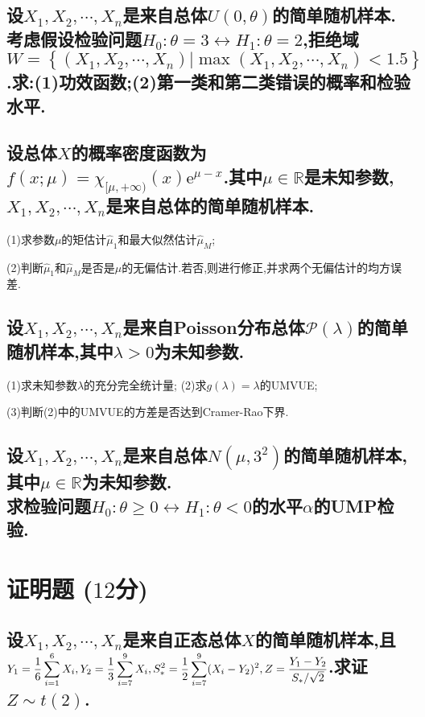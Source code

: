 \documentclass[UTF8]{article}
\begin{document}
    \subsection{
        设$X_1,X_2,\cdots,X_n$是来自总体$U(0,\theta)$的简单随机样本.考虑假设检验问题$H_0:\theta=3\leftrightarrow H_1:\theta=2$,拒绝域$W=\left\{ (X_1,X_2,\cdots,X_n)|\max(X_1,X_2,\cdots,X_n)<1.5\right\}$.求:(1)功效函数;(2)第一类和第二类错误的概率和检验水平.
    }
    \subsection{
        设总体$X$的概率密度函数为$f(x;\mu)=\chi_{[\mu,+\infty)}(x)\textrm{e}^{\mu-x}$.其中$\mu\in\mathbb{R}$是未知参数,$X_1,X_2,\cdots,X_n$是来自总体的简单随机样本.
    }(1)求参数$\mu$的矩估计$\hat{\mu}_1$和最大似然估计$\hat{\mu}_M$;\par 
    (2)判断$\hat{\mu}_1$和$\hat{\mu}_M$是否是$\mu$的无偏估计.若否,则进行修正,并求两个无偏估计的均方误差.
    \subsection{
        设$X_1,X_2,\cdots,X_n$是来自Poisson分布总体$\mathcal{P}(\lambda)$的简单随机样本,其中$\lambda>0$为未知参数.
    }(1)求未知参数$\lambda$的充分完全统计量; (2)求$g(\lambda)=\lambda$的UMVUE;\par 
    (3)判断(2)中的UMVUE的方差是否达到Cramer-Rao下界.
    \subsection{
        设$X_1,X_2,\cdots,X_n$是来自总体$N(\mu,3^2)$的简单随机样本,其中$\mu\in\mathbb{R}$为未知参数.\\ 求检验问题$H_0:\theta\geq 0\leftrightarrow H_1:\theta<0$的水平$\alpha$的UMP检验.
    }

    \section{证明题 \small($12$分)}
    \subsection{
        设$X_1,X_2,\cdots,X_n$是来自正态总体$X$的简单随机样本,且$\displaystyle Y_1=\frac{1}{6}\sum_{i=1}^{6}X_i,Y_2=\frac{1}{3}\sum_{i=7}^{9}X_i,S_*^2=\frac{1}{2}\sum_{i=7}^{9}(X_i-Y_2)^2,\\ Z=\frac{Y_1-Y_2}{S_*/\sqrt{2}}$.求证$Z\sim t(2)$.
    }
\end{document}
